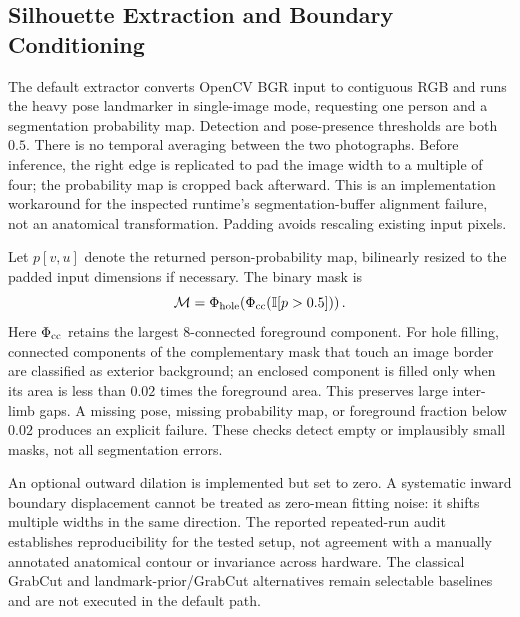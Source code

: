 \documentclass[journal]{IEEEtran}
\begin{document}
\subsection{Silhouette Extraction and Boundary Conditioning}
\label{subsec:segmentation}
The default extractor converts OpenCV BGR input to contiguous RGB and runs the heavy pose landmarker in single-image mode, requesting one person and a segmentation probability map. Detection and pose-presence thresholds are both $0.5$. There is no temporal averaging between the two photographs. Before inference, the right edge is replicated to pad the image width to a multiple of four; the probability map is cropped back afterward. This is an implementation workaround for the inspected runtime's segmentation-buffer alignment failure, not an anatomical transformation. Padding avoids rescaling existing input pixels.

Let $p[v,u]$ denote the returned person-probability map, bilinearly resized to the padded input dimensions if necessary. The binary mask is
\begin{equation}
\mathcal M=\Phi_{\rm hole}\!\left(\Phi_{\rm cc}\!\left(\mathbb I[p>0.5]\right)\right).
\label{eq:mask}
\end{equation}
Here $\Phi_{\rm cc}$ retains the largest 8-connected foreground component. For hole filling, connected components of the complementary mask that touch an image border are classified as exterior background; an enclosed component is filled only when its area is less than $0.02$ times the foreground area. This preserves large inter-limb gaps. A missing pose, missing probability map, or foreground fraction below $0.02$ produces an explicit failure. These checks detect empty or implausibly small masks, not all segmentation errors.

An optional outward dilation is implemented but set to zero. A systematic inward boundary displacement cannot be treated as zero-mean fitting noise: it shifts multiple widths in the same direction. The reported repeated-run audit establishes reproducibility for the tested setup, not agreement with a manually annotated anatomical contour or invariance across hardware. The classical GrabCut and landmark-prior/GrabCut alternatives remain selectable baselines and are not executed in the default path.
\end{document}

